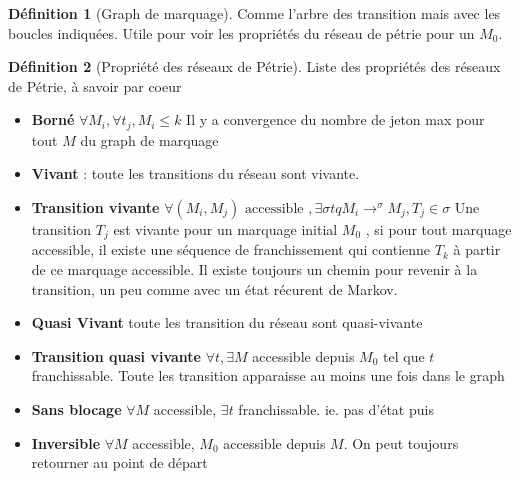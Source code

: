 \documentclass{article}
\theoremstyle{plain}%
\theoremstyle{definition}
\newtheorem{defn}{Définition}[section]
\theoremstyle{remark}
\begin{document}
\begin{defn}[Graph de marquage]
    Comme l'arbre des transition mais avec les boucles indiquées. Utile pour voir les propriétés du réseau de pétrie pour un $ M_0 $.
\end{defn}

\begin{defn}[Propriété des réseaux de Pétrie]
    Liste des propriétés des réseaux de Pétrie, à savoir par coeur
    \begin{itemize}
        \item \textbf{Borné} $ \forall M_i, \forall t_j, M_i \leq k $ Il y a convergence du nombre de jeton max pour tout $ M $ du graph de marquage
        \item \textbf{Vivant} : toute les transitions du réseau sont vivante.
        \item \textbf{Transition vivante} $ \forall (M_i, M_j) \text{ accessible }, \exists \sigma tq M_i \to ^\sigma M_j, T_j \in \sigma  $ Une transition $ T_j $  est vivante pour un marquage initial $ M_0 $ , si pour tout marquage accessible, il existe une séquence de franchissement qui contienne $ T_k $ à partir de ce marquage accessible. Il existe toujours un chemin pour revenir à la transition, un peu comme avec un état récurent de Markov.
        \item \textbf{Quasi Vivant} toute les transition du réseau sont quasi-vivante
        \item \textbf{Transition quasi vivante} $ \forall t, \exists M $ accessible depuis $ M_0 $ tel que $ t $ franchissable. Toute les transition apparaisse au moins une fois dans le graph
        \item \textbf{Sans blocage} $ \forall M $ accessible, $ \exists t $ franchissable. ie. pas d'état puis
        \item \textbf{Inversible} $ \forall M $ accessible, $ M_0 $ accessible depuis $ M $. On peut toujours retourner au point de départ
    \end{itemize}
\end{defn}
\end{document}
